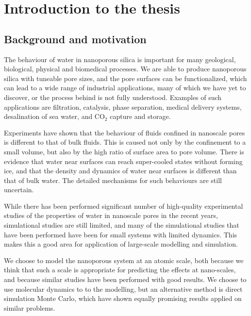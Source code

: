 \chapter*{Introduction to the thesis}%
%

\section*{Background and motivation}
%

The behaviour of water in nanoporous silica is important for many geological, biological, physical and biomedical processes. We are able to produce nanoporous silica with tuneable pore sizes, and the pore surfaces can be functionalized, which can lead to a wide range of industrial applications, many of which we have yet to discover, or the process behind is not fully understood. Examples of such applications are filtration, catalysis, phase separation, medical delivery systems, desalination of sea water, and CO$_2$ capture and storage.

Experiments have shown that the behaviour of fluids confined in nanoscale pores is different to that of bulk fluids. This is caused not only by the confinement to a small volume, but also by the high ratio of surface area to pore volume. There is evidence that water near surfaces can reach super-cooled states without forming ice, and that the density and dynamics of water near surfaces is different than that of bulk water. The detailed mechanisms for such behaviours are still uncertain.

While there has been performed significant number of high-quality experimental studies of the properties of water in nanoscale pores in the recent years, simulational studies are still limited, and many of the simulational studies that have been performed have been for small systems with limited dynamics. This makes this a good area for application of large-scale modelling and simulation.

We choose to model the nanoporous system at an atomic scale, both because we think that such a scale is appropriate for predicting the effects at nano-scales, and because similar studies have been performed with good results. We choose to use molecular dynamics to to the modelling, but an alternative method is direct simulation Monte Carlo, which have shown equally promising results applied on similar problems.


